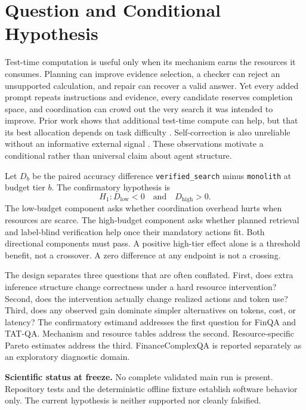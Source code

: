 \section{Question and Conditional Hypothesis}

Test-time computation is useful only when its mechanism earns the resources it
consumes. Planning can improve evidence selection, a checker can reject an
unsupported calculation, and repair can recover a valid answer. Yet every added
prompt repeats instructions and evidence, every candidate reserves completion
space, and coordination can crowd out the very search it was intended to
improve. Prior work shows that additional test-time compute can help, but that
its best allocation depends on task difficulty \citep{snell2024testtime}.
Self-correction is also unreliable without an informative external signal
\citep{kamoi2024selfcorrection}. These observations motivate a conditional
rather than universal claim about agent structure.

Let $D_b$ be the paired accuracy difference
\texttt{verified\_search} minus \texttt{monolith} at budget tier $b$. The
confirmatory hypothesis is
\begin{equation}
H_1: D_{\mathrm{low}}<0 \quad\text{and}\quad D_{\mathrm{high}}>0.
\label{eq:hypothesis}
\end{equation}
The low-budget component asks whether coordination overhead hurts when resources
are scarce. The high-budget component asks whether planned retrieval and
label-blind verification help once their mandatory actions fit. Both directional
components must pass. A positive high-tier effect alone is a threshold benefit,
not a crossover. A zero difference at any endpoint is not a crossing.

The design separates three questions that are often conflated. First, does extra
inference structure change correctness under a hard resource intervention?
Second, does the intervention actually change realized actions and token use?
Third, does any observed gain dominate simpler alternatives on tokens, cost, or
latency? The confirmatory estimand addresses the first question for FinQA and
TAT-QA. Mechanism and resource tables address the second. Resource-specific
Pareto estimates address the third. FinanceComplexQA is reported separately as
an exploratory diagnostic domain.

\begin{statusbox}
\textbf{Scientific status at freeze.} No complete validated main run is present.
Repository tests and the deterministic offline fixture establish software
behavior only. The current hypothesis is neither supported nor cleanly
falsified.
\end{statusbox}
